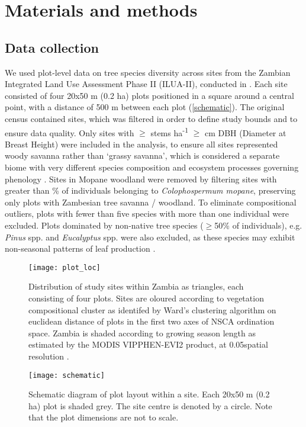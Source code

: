 \documentclass[11pt,a4paper]{article}
\begin{document}
\section{Materials and methods}

\subsection{Data collection}

We used plot-level data on tree species diversity across \nSites{} sites from the Zambian Integrated Land Use Assessment Phase II (ILUA-II), conducted in \censusDate{} \citep{Mukosha2009, Pelletier2018}. Each site consisted of four 20x50 m (0.2 ha) plots positioned in a square around a central point, with a distance of 500 m between each plot (\autoref{schematic}). The original census contained \nTotalSites{} sites, which was filtered in order to define study bounds and to ensure data quality. Only sites with $\geq$\stemsHa{} stems ha\textsuperscript{-1} $\geq$\stemSize{} cm DBH (Diameter at Breast Height) were included in the analysis, to ensure all sites represented woody savanna rather than `grassy savanna', which is considered a separate biome with very different species composition and ecosystem processes governing phenology \citep{Parr2014}. Sites in Mopane woodland were removed by filtering sites with greater than \mopanePer{}\% of individuals belonging to \textit{Colophospermum mopane}, preserving only plots with Zambesian tree savanna / woodland. To eliminate compositional outliers, plots with fewer than five species with more than one individual were excluded. Plots dominated by  non-native tree species ($\geq$50\% of individuals), e.g. \textit{Pinus} spp. and \textit{Eucalyptus} spp. were also excluded, as these species may exhibit non-seasonal patterns of leaf production \citep{}.

\begin{figure}[H]
\centering
	\texttt{[image: plot\_loc]}
	\caption{Distribution of study sites within Zambia as triangles, each consisting of four plots. Sites are oloured according to vegetation compositional cluster as identifed by Ward's clustering algorithm on euclidean distance of plots in the first two axes of NSCA ordination space. Zambia is shaded according to growing season length as estimated by the MODIS VIPPHEN-EVI2 product, at 0.05\textdegree spatial resolution \citep{VIPPHEN}.}
	\label{plot_loc}
\end{figure}

\begin{figure}[H]
\centering
	\texttt{[image: schematic]}
	\caption{Schematic diagram of plot layout within a site. Each 20x50 m (0.2 ha) plot is shaded grey. The site centre is denoted by a circle. Note that the plot dimensions are not to scale.}
	\label{schematic}
\end{figure}
\end{document}
